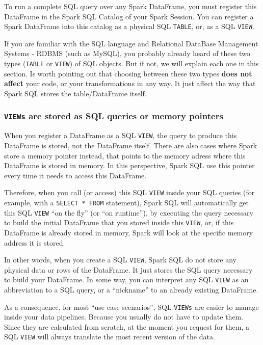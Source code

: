 \documentclass[
  11pt,
  letterpaper,
  DIV=11,
  numbers=noendperiod]{scrreprt}
\begin{document}
To run a complete SQL query over any Spark DataFrame, you must register
this DataFrame in the Spark SQL Catalog of your Spark Session. You can
register a Spark DataFrame into this catalog as a physical SQL
\texttt{TABLE}, or, as a SQL \texttt{VIEW}.

If you are familiar with the SQL language and Relational DataBase
Management Systems - RDBMS (such as MySQL), you probably already heard
of these two types (\texttt{TABLE} or \texttt{VIEW}) of SQL objects. But
if not, we will explain each one in this section. Is worth pointing out
that choosing between these two types \textbf{does not affect} your
code, or your transformations in any way. It just affect the way that
Spark SQL stores the table/DataFrame itself.

\hypertarget{views-are-stored-as-sql-queries-or-memory-pointers}{%
\subsubsection{\texorpdfstring{\texttt{VIEWs} are stored as SQL queries
or memory
pointers}{VIEWs are stored as SQL queries or memory pointers}}\label{views-are-stored-as-sql-queries-or-memory-pointers}}

When you register a DataFrame as a SQL \texttt{VIEW}, the query to
produce this DataFrame is stored, not the DataFrame itself. There are
also cases where Spark store a memory pointer instead, that points to
the memory adress where this DataFrame is stored in memory. In this
perspective, Spark SQL use this pointer every time it needs to access
this DataFrame.

Therefore, when you call (or access) this SQL \texttt{VIEW} inside your
SQL queries (for example, with a \texttt{SELECT\ *\ FROM} statement),
Spark SQL will automatically get this SQL \texttt{VIEW} ``on the fly''
(or ``on runtime''), by executing the query necessary to build the
initial DataFrame that you stored inside this \texttt{VIEW}, or, if this
DataFrame is already stored in memory, Spark will look at the specific
memory address it is stored.

In other words, when you create a SQL \texttt{VIEW}, Spark SQL do not
store any physical data or rows of the DataFrame. It just stores the SQL
query necessary to build your DataFrame. In some way, you can interpret
any SQL \texttt{VIEW} as an abbreviation to a SQL query, or a
``nickname'' to an already existing DataFrame.

As a consequence, for most ``use case scenarios'', SQL \texttt{VIEWs}
are easier to manage inside your data pipelines. Because you usually do
not have to update them. Since they are calculated from scratch, at the
moment you request for them, a SQL \texttt{VIEW} will always translate
the most recent version of the data.
\end{document}
